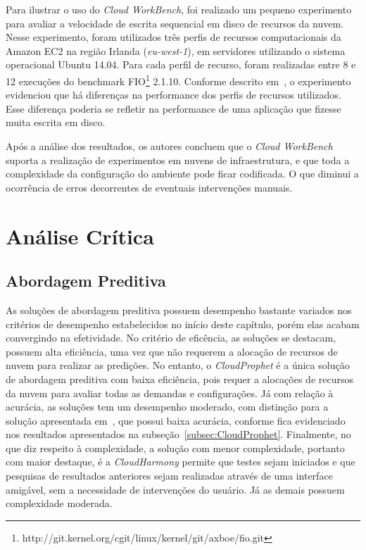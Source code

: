 Para ilustrar o uso do \textit{Cloud WorkBench}, foi realizado um pequeno experimento para avaliar a velocidade de escrita sequencial em disco de recursos da nuvem. Nesse experimento, foram utilizados três perfis de recursos computacionais da Amazon EC2 na região Irlanda (\textit{eu-west-1}), em servidores utilizando o sistema operacional Ubuntu 14.04. Para cada perfil de recurso, foram realizadas entre 8 e 12 execuções do benchmark FIO\footnote{http://git.kernel.org/cgit/linux/kernel/git/axboe/fio.git} 2.1.10. Conforme descrito em~\cite{scheuner2014cloud}, o experimento evidenciou que há diferenças na performance dos perfis de recursos utilizados. Esse diferença poderia se refletir na performance de uma aplicação que fizesse muita escrita em disco.

Após a análise dos resultados, os autores concluem que o \textit{Cloud WorkBench} suporta a realização de experimentos em nuvens de infraestrutura, e que toda a complexidade da configuração do ambiente pode ficar codificada. O que diminui a ocorrência de erros decorrentes de eventuais intervenções manuais.

\section{Análise Crítica}

\subsection{Abordagem Preditiva}
As soluções de abordagem preditiva possuem desempenho bastante variados nos
critérios de desempenho estabelecidos no início deste capítulo, porém elas
acabam convergindo na efetividade. No critério de eficência, as soluções se
destacam, possuem alta eficiência, uma vez que não requerem a alocação de
recursos de nuvem para realizar as predições. No entanto, o
\textit{CloudProphet} é a única solução de abordagem preditiva
com baixa eficiência, pois requer a alocações de recursos da nuvem para
avaliar todas as demandas e configurações. Já com relação à acurácia, as
soluções tem um desempenho moderado, com distinção para a solução apresentada
em~\cite{fittkau2012cdosim}, que possui baixa acurácia, conforme fica
evidenciado nos resultados apresentados na subseção~\ref{subsec:CloudProphet}.
Finalmente, no que diz respeito à complexidade, a solução com menor
complexidade, portanto com maior destaque, é a \textit{CloudHarmony} permite que
testes sejam iniciados e que pesquisas de resultados anteriores sejam realizadas
através de uma interface amigável, sem a necessidade de intervenções do usuário.
Já as demais possuem complexidade moderada.
 

